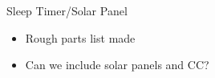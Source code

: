 




\begin{frame}{Sleep Timer/Solar Panel}
    \begin{itemize}
        \item Rough parts list made
        \item Can we include solar panels and CC?
    \end{itemize}
\end{frame}


